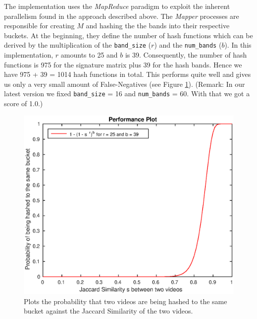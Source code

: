 \documentclass[a4paper, 11pt]{article}
\begin{document}
The implementation uses the \textit{MapReduce} paradigm to exploit the inherent parallelism found in the approach described above. \newline The \textit{Mapper} processes are responsible for creating $M$ and hashing the the bands into their respective buckets. At the beginning, they define the number of hash functions which can be derived by the multiplication of the \texttt{band\_size} ($r$) and the \texttt{num\_bands} ($b$). In this implementation, $r$ amounts to 25 and $b$ is 39. Consequently, the number of hash functions is 975 for the signature matrix plus 39 for the hash bands. Hence we have 975 + 39 = 1014 hash functions in total. This performs quite well and gives us only a very small amount of False-Negatives (see Figure \ref{perfPlot}). (Remark: In our latest version we fixed \texttt{band\_size} = 16 and \texttt{num\_bands} = 60. With that we got a score of 1.0.)
\begin{figure}
	\begin{center}
		\includegraphics[scale=0.4]{performance}
		\caption{Plots the probability that two videos are being hashed to the same bucket against the Jaccard Similarity of the two videos.}
		\label{perfPlot}
	\end{center}
\end{figure}
\end{document}
